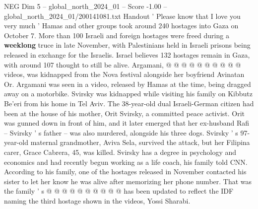 \begin{textsample}{NEG Dim 5 – global\_north\_2024\_01 – Score -1.00 – global\_north\_2024\_01/200141081.txt}
Handout ' Please know that I love you very much ' Hamas and other groups took around 240 hostages into Gaza on October 7.
More than 100 Israeli and foreign hostages were freed during a \textbf{weeklong} truce in late November, with Palestinians held in Israeli prisons being released in exchange for the Israelis.
Israel believes 132 hostages remain in Gaza, with around 107 thought to still be alive.
Argamani, @ @ @ @ @ @ @ @ @ @ videos, was kidnapped from the Nova festival alongside her boyfriend Avinatan Or.
Argamani was seen in a video, released by Hamas at the time, being dragged away on a motorbike.
Svirsky was kidnapped while visiting his family on Kibbutz Be'eri from his home in Tel Aviv.
The 38-year-old dual Israeli-German citizen had been at the house of his mother, Orit Svirsky, a committed peace activist.
Orit was gunned down in front of him, and it later emerged that her ex-husband Rafi -- Svirsky ' s father -- was also murdered, alongside his three dogs.
Svirsky ' s 97-year-old maternal grandmother, Aviva Sela, survived the attack, but her Filipina carer, Grace Cabrera, 45, was killed.
Svirsky has a degree in psychology and economics and had recently begun working as a life coach, his family told CNN.
According to his family, one of the hostages released in November contacted his sister to let her know he was alive after memorizing her phone number.
That was the family ' s @ @ @ @ @ @ @ @ @ @ has been updated to reflect the IDF naming the third hostage shown in the videos, Yossi Sharabi.

\end{textsample}
